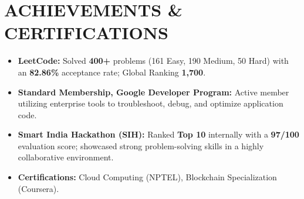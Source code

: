 \documentclass[letterpaper,11pt]{article}
\newcommand{\resumeItem}[1]{
  \item\small{
    {#1 \vspace{-1pt}}
  }
}
\newcommand{\resumeItemListStart}{\begin{itemize}}
\newcommand{\resumeItemListEnd}{\end{itemize}\vspace{0pt}}
\begin{document}
\section{ACHIEVEMENTS \& CERTIFICATIONS}
    \resumeItemListStart
        \resumeItem{\textbf{LeetCode:} Solved \textbf{400+} problems (161 Easy, 190 Medium, 50 Hard) with an \textbf{82.86\%} acceptance rate; Global Ranking \textbf{1,700}.}
        \resumeItem{\textbf{Standard Membership, Google Developer Program:} Active member utilizing enterprise tools to troubleshoot, debug, and optimize application code.}
        \resumeItem{\textbf{Smart India Hackathon (SIH):} Ranked \textbf{Top 10} internally with a \textbf{97/100} evaluation score; showcased strong problem-solving skills in a highly collaborative environment.}
        \resumeItem{\textbf{Certifications:} Cloud Computing (NPTEL), Blockchain Specialization (Coursera).}
    \resumeItemListEnd
\end{document}
